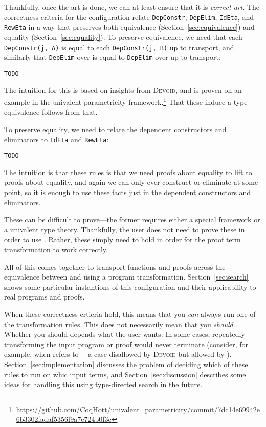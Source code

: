 Thankfully, once the art is done, we can at least ensure that it is \textit{correct art}.
The correctness criteria for the configuration relate \lstinline{DepConstr}, \lstinline{DepElim}, \lstinline{IdEta}, and \lstinline{RewEta}
in a way that preserves both equivalence (Section~\ref{sec:equivalence}) and equality (Section~\ref{sec:equality}).
To preserve equivalence, we need that each \lstinline{DepConstr(j, A)} is equal to each \lstinline{DepConstr(j, B)} up to transport,
and similarly that \lstinline{DepElim} over \A is equal to \lstinline{DepElim} over \B up to transport:

\begin{lstlisting}
TODO
\end{lstlisting}
The intuition for this is based on insights from \textsc{Devoid},
and is proven on an example in the univalent parametricity framework.\footnote{\url{https://github.com/CoqHott/univalent_parametricity/commit/7dc14e69942e6b3302fadaf5356f9a7e724b0f3c}}
That these induce a type equivalence follows from that.

To preserve equality, we need to relate the dependent constructors and eliminators to
\lstinline{IdEta} and \lstinline{RewEta}:

\begin{lstlisting}
TODO
\end{lstlisting}
The intuition is that these rules is that we need proofs about equality to lift to proofs about equality,
and again we can only ever construct or eliminate at some point, so it is enough
to use these facts just in the dependent constructors and eliminators.

These can be difficult to prove---the former requires either a special framework %
or a univalent type theory.
Thankfully, the user does not need to prove these in order to use \toolname.
Rather, these simply need to hold in order for the proof term transformation to work correctly.

All of this comes together to transport functions and proofs across the equivalence between \A and \B
using a program transformation.
Section~\ref{sec:search} shows some particular instantions of this configuration and their applicability to real programs and proofs.

When these correctness crtieria hold, this means that you \textit{can} always run one of the transformation rules.
This does not necessarily mean that you \textit{should}.
Whether you should depends what the user wants.
In some cases, repeatedly transforming the input program or proof would never terminate
(consider, for example, when \B refers to \A---a case disallowed by \textsc{Devoid} but allowed by \toolname).
Section~\ref{sec:implementation} discusses the problem of deciding which of these rules to run
on whic input terms, and Section~\ref{sec:discussion} describes some ideas
for handling this using type-directed search in the future.


